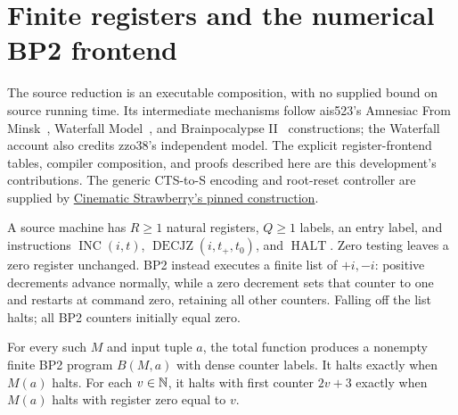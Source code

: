 \section{Finite registers and the numerical BP2 frontend}
\label{sec:source-registers}

The source reduction is an executable composition, with no supplied bound on
source running time.  Its intermediate mechanisms follow ais523's
Amnesiac From Minsk~\cite{amnesiac},
Waterfall Model~\cite{waterfall},
and Brainpocalypse II~\cite{bp2}
constructions; the Waterfall account also credits zzo38's independent model.
The explicit register-frontend tables, compiler composition, and proofs
described here are this development's contributions.  The generic CTS-to-S
encoding and root-reset controller are supplied by
\href{https://github.com/cstrawberry/predictive-universe/tree/85a867988442fc423279341200f81634a1e65582/docs/paper/related/pure_s_universality}{Cinematic Strawberry's pinned construction}.

A source machine has $R\geq1$ natural registers, $Q\geq1$ labels, an entry
label, and instructions $\operatorname{INC}(i,t)$,
$\operatorname{DECJZ}(i,t_+,t_0)$, and $\operatorname{HALT}$.
Zero testing leaves a zero register unchanged.  BP2 instead executes a finite
list of $+i,-i$: positive decrements advance normally, while a zero decrement
sets that counter to one and restarts at command zero, retaining all other
counters.  Falling off the list halts; all BP2 counters initially equal zero.

\begin{theorem}
For every such $M$ and input tuple $a$, the total function
 produces a nonempty finite BP2 program $B(M,a)$
with dense counter labels.  It halts exactly when $M(a)$ halts.  For each
$v\in\mathbb{N}$, it halts with first counter $2v+3$ exactly when $M(a)$ halts with
register zero equal to $v$.
\end{theorem}

